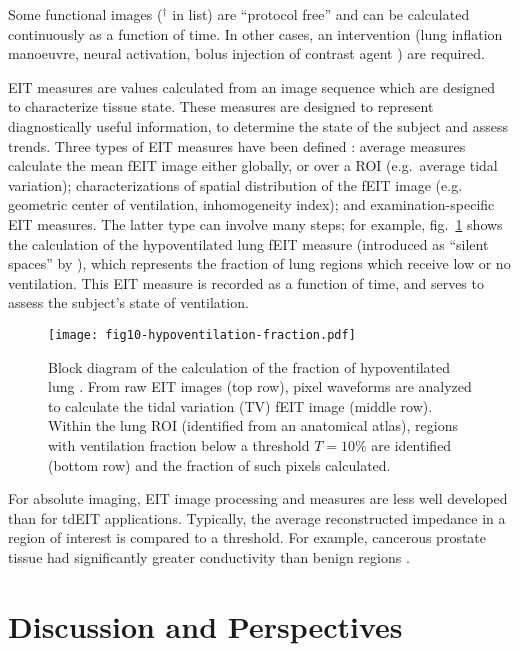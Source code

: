 \documentclass[10pt,journal]{IEEEtran}\def\TBLWIDA{15mm}\def\TBLWIDB{60mm}
\newcommand\fref[1]{fig.\ \ref{#1}}
\begin{document}
Some functional images ($^\dagger$ in list) are ``protocol free'' and can be
calculated continuously as a function of time. In other cases, an intervention
(lung inflation manoeuvre, neural activation, bolus injection of contrast
agent \cite{Frerichs2002Perfusion}) are required.


EIT measures are values calculated from an image sequence which are designed to
characterize tissue state. These measures are designed to represent
diagnostically useful information, to determine the state of the subject
and assess trends.
 Three types of EIT measures
have been defined \cite{Frerichs2017Chest}: 
average measures calculate the mean fEIT image
either globally, or over a ROI \cite{Ferrario2012morphological}
(e.g.\ average tidal variation);
characterizations of spatial distribution of the fEIT image
(e.g. geometric center of ventilation, inhomogeneity index);
and examination-specific EIT measures.
The latter type can involve many steps; for example, 
\fref{fig:fEIT_eg_silent_spaces} shows the
calculation of the hypoventilated lung fEIT measure 
(introduced as ``silent spaces'' by \cite{Waldmann2015Silent}),
which represents the fraction of lung regions which receive
low or no ventilation. This EIT measure is recorded as a function of time, and
serves to assess the subject's state of ventilation.

\begin{figure} \centering
   \texttt{[image: fig10-hypoventilation-fraction.pdf]}
\caption{%
Block diagram of the calculation of the
fraction of hypoventilated lung \cite{Waldmann2015Silent}.
From raw EIT images (top row), pixel waveforms are analyzed
to calculate the tidal variation (TV) fEIT image (middle row).
Within the lung ROI (identified from an anatomical atlas),
regions with ventilation fraction below a threshold $T=10\%$
are identified (bottom row) and the fraction of such pixels calculated.
}
\label{fig:fEIT_eg_silent_spaces}
\end{figure}

For absolute imaging, EIT image processing and measures are less
well developed than for tdEIT applications. Typically, the
average reconstructed impedance in a region of interest
is compared to a threshold. For example, cancerous prostate
tissue had significantly greater conductivity than benign
regions \cite{Wan2013Transrectal}.


\section{Discussion and Perspectives}
\end{document}
